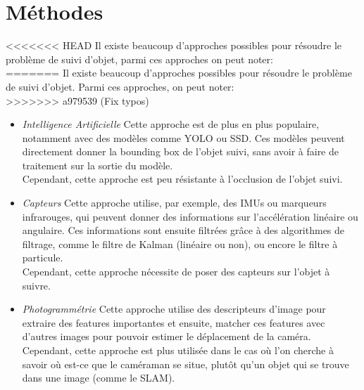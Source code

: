 \section{Méthodes}
<<<<<<< HEAD
Il existe beaucoup d'approches possibles pour résoudre le problème de suivi d'objet, parmi ces approches on peut noter:\\
=======
Il existe beaucoup d'approches possibles pour résoudre le problème de suivi d'objet. Parmi ces approches, on peut noter:\\
>>>>>>> a979539 (Fix typos)
\begin{itemize}
	\item \textit{Intelligence Artificielle}\newline
	Cette approche est de plus en plus populaire, notamment avec des modèles comme YOLO\cite{redmon_you_2016} ou SSD\cite{liu_ssd_2016}. Ces modèles peuvent directement donner la bounding box de l'objet suivi, sans avoir à faire de traitement sur la sortie du modèle.\\
	Cependant, cette approche est peu résistante à l'occlusion de l'objet suivi.\\
	
	\item \textit{Capteurs}\newline
	Cette approche utilise, par exemple, des IMUs ou marqueurs infrarouges, qui peuvent donner des informations sur l'accélération linéaire ou angulaire. Ces informations sont ensuite filtrées grâce à des algorithmes de filtrage, comme le filtre de Kalman (linéaire ou non), ou encore le filtre à particule.\\
	Cependant, cette approche nécessite de poser des capteurs sur l'objet à suivre.\\
	
	\item \textit{Photogrammétrie}\newline
	Cette approche utilise des descripteurs d'image pour extraire des features importantes et ensuite, matcher ces features avec d'autres images pour pouvoir estimer le déplacement de la caméra.\\
	Cependant, cette approche est plus utilisée dans le cas où l'on cherche à savoir où est-ce que le caméraman se situe, plutôt qu'un objet qui se trouve dans une image (comme le SLAM).\\
	

\end{itemize}
